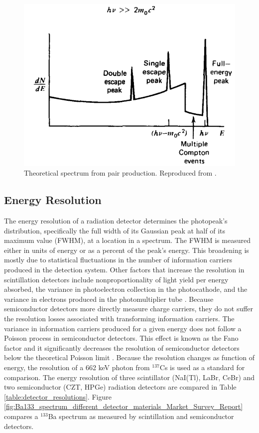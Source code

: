 \begin{figure}[H]
\centering
\includegraphics[width=0.6\linewidth]{images/pair_production_spectra}
\caption{Theoretical spectrum from pair production. Reproduced from \cite{knoll}.}
\label{fig:pair_production_spectra}
\end{figure}


\subsection{Energy Resolution} \label{subsection_energy_resolution}

The energy resolution of a radiation detector determines the photopeak's distribution, specifically the full width of its Gaussian peak at half of its maximum value (FWHM), at a location in a spectrum. The FWHM is measured either in units of energy or as a percent of the peak's energy. This broadening is mostly due to statistical fluctuations in the number of information carriers produced in the detection system. Other factors that increase the resolution in scintillation detectors include nonproportionality of light yield per energy absorbed, the variance in photoelectron collection in the photocathode, and the variance in electrons produced in the photomultiplier tube \cite{knoll}. Because semiconductor detectors more directly measure charge carriers, they do not suffer the resolution losses associated with transforming information carriers. The variance in information carriers produced for a given energy does not follow a Poisson process in semiconductor detectors. This effect is known as the Fano factor and it significantly decreases the resolution of semiconductor detectors below the theoretical Poisson limit \cite{knoll}. Because the resolution changes as function of energy, the resolution of a 662 keV photon from $^{137}$Cs is used as a standard for comparison. The energy resolution of three scintillator (NaI(Tl), LaBr, CeBr) and two semiconductor (CZT, HPGe) radiation detectors are compared in Table \ref{table:detector_resolutions}. Figure \ref{fig:Ba133_spectrum_different_detector_materials_Market_Survey_Report} compares a $^{133}$Ba spectrum as measured by scintillation and semiconductor detectors. 

